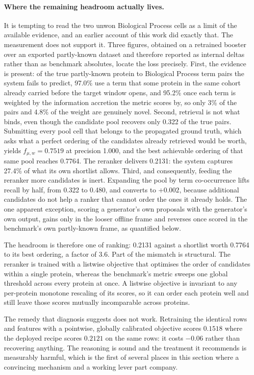 \paragraph{Where the remaining headroom actually lives.}
It is tempting to read the two unwon Biological Process cells as a limit of the
available evidence, and an earlier account of this work did exactly that. The
measurement does not support it. Three figures, obtained on a retrained booster
over an exported partly-known dataset and therefore reported as internal deltas
rather than as benchmark absolutes, locate the loss precisely. First, the evidence
is present: of the true partly-known protein to Biological Process term pairs the
system fails to predict, 97.0\% use a term that some protein in the same cohort
already carried before the target window opens, and 95.2\% once each term is
weighted by the information accretion the metric scores by, so only 3\% of the
pairs and 4.8\% of the weight are genuinely novel. Second,
retrieval is not what binds, even though the candidate pool recovers only 0.322 of
the true pairs. Submitting every pool cell that belongs to the propagated ground
truth, which asks what a perfect ordering of the candidates already retrieved would
be worth, yields $f_{\mu,w}=0.7519$ at precision 1.000, and the best achievable
ordering of that same pool reaches 0.7764. The reranker delivers 0.2131: the system
captures 27.4\% of what its own shortlist allows. Third, and consequently, feeding
the reranker more candidates is inert. Expanding the pool by term co-occurrence lifts
recall by half, from 0.322 to 0.480, and converts to $+0.002$, because additional
candidates do not help a ranker that cannot order the ones it already holds. The one
apparent exception, scoring a generator's own proposals with the generator's own output,
gains only in the looser offline frame and reverses once scored in the benchmark's own
partly-known frame, as quantified below.

The headroom is therefore one of ranking: 0.2131 against a shortlist worth 0.7764
to its best ordering, a factor of 3.6. Part of the mismatch is structural. The
reranker is trained with a listwise objective that optimises the order of
candidates within a single protein, whereas the benchmark's metric sweeps one
global threshold across every protein at once. A listwise objective is invariant
to any per-protein monotone rescaling of its scores, so it can order each protein
well and still leave those scores mutually incomparable across proteins.

The remedy that diagnosis suggests does not work. Retraining the identical rows
and features with a pointwise, globally calibrated objective scores $0.1518$ where
the deployed recipe scores $0.2121$ on the same rows: it costs $-0.06$ rather than
recovering anything. The reasoning is sound and the treatment it recommends is
measurably harmful, which is the first of several places in this section where a
convincing mechanism and a working lever part company.

